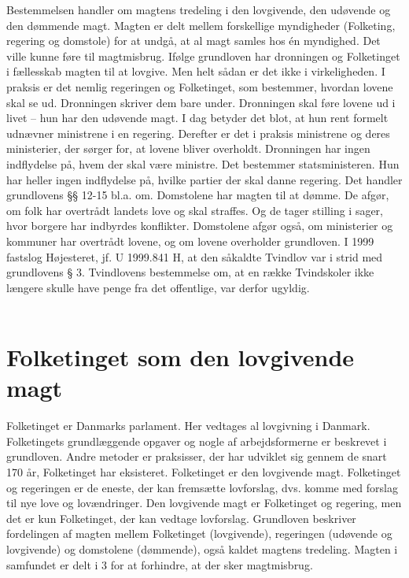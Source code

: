 \documentclass[]{book}
\begin{document}
Bestemmelsen handler om magtens tredeling i den lovgivende, den udøvende og den dømmende magt. Magten er delt mellem forskellige myndigheder (Folketing, regering og domstole) for at undgå, at al magt samles hos én myndighed. Det ville kunne føre til magtmisbrug.
Ifølge grundloven har dronningen og Folketinget i fællesskab magten til at lovgive. Men helt sådan er det ikke i virkeligheden. I praksis er det nemlig regeringen og Folketinget, som bestemmer, hvordan lovene skal se ud. Dronningen skriver dem bare under. Dronningen skal føre lovene ud i livet -- hun har den udøvende magt. I dag betyder det blot, at hun rent formelt udnævner ministrene i en regering. Derefter er det i praksis ministrene og deres ministerier, der sørger for, at lovene bliver overholdt.
Dronningen har ingen indflydelse på, hvem der skal være ministre. Det bestemmer statsministeren. Hun har heller ingen indflydelse på, hvilke partier der skal danne regering. Det handler grundlovens §§ 12-15 bl.a. om.
Domstolene har magten til at dømme. De afgør, om folk har overtrådt landets love og skal straffes. Og de tager stilling i sager, hvor borgere har indbyrdes konflikter. Domstolene afgør også, om ministerier og kommuner har overtrådt lovene, og om lovene overholder grundloven.
I 1999 fastslog Højesteret, jf. U 1999.841 H, at den såkaldte Tvindlov var i strid med grundlovens § 3. Tvindlovens bestemmelse om, at en række Tvindskoler ikke længere skulle have penge fra det offentlige, var derfor ugyldig.\\
 

\hypertarget{folketinget-som-den-lovgivende-magt}{%
\section{Folketinget som den lovgivende magt}\label{folketinget-som-den-lovgivende-magt}}

Folketinget er Danmarks parlament. Her vedtages al lovgivning i Danmark. Folketingets grundlæggende opgaver og nogle af arbejdsformerne er beskrevet i grundloven. Andre metoder er praksisser, der har udviklet sig gennem de snart 170 år, Folketinget har eksisteret.
Folketinget er den lovgivende magt. Folketinget og regeringen er de eneste, der kan fremsætte lovforslag, dvs. komme med forslag til nye love og lovændringer. Den lovgivende magt er Folketinget og regering, men det er kun Folketinget, der kan vedtage lovforslag.
Grundloven beskriver fordelingen af magten mellem Folketinget (lovgivende), regeringen (udøvende og lovgivende) og domstolene (dømmende), også kaldet magtens tredeling. Magten i samfundet er delt i 3 for at forhindre, at der sker magtmisbrug.
\end{document}
